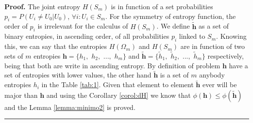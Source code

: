 \documentclass[journal]{IEEEtran}
\newenvironment{proof}[1][Proof]{\textbf{#1.} }{\ \rule{0.5em}{0.5em}}
\begin{document}
\begin{proof}
\label{proof:minimo2}
The joint entropy $H(S_m)$ is in function of a set probabilities
$p_i=P(U_i\neq U_0|U_0)$, $\forall i: U_i \in S_m$. For the symmetry 
of entropy function, the order of $p_i$ is irrelevant for the calculus of 
$H(S_m)$. We define $\mathbf{\tilde{h}}$ as a set of binary entropies,
in ascending order, of all probabilities $p_i$ linked to $S_m$.
Knowing this, we can say that the entropies $H(\Omega_m)$ and $H(S_m)$ are in function of 
two sets of $m$ entropies 
$\mathbf{h}=\{h_{1},$ $h_{2},$ $...,$ $h_{m}\}$ and
$\mathbf{\tilde{h}}=\{\tilde{h}_{1},$ $\tilde{h}_{2},$ $...,$ $\tilde{h}_{m}\}$ respectively, being that 
both are write in ascending entropy. By definition of problem $\mathbf{h}$ have
a set of entropies with lower values, the other hand $\mathbf{\tilde{h}}$ is a 
set of $m$ anybody entropies $h_i$ in the Table \ref{tab:1}. Given that
element to element $\mathbf{\tilde{h}}$ ever will be major than $\mathbf{h}$ and
using the Corollary \ref{corol:dH} we know that $\phi(\mathbf{h}) \leq \phi(\mathbf{\tilde{h}})$
and the Lemma \ref{lemma:minimo2} is proved.
\end{proof}
\end{document}
